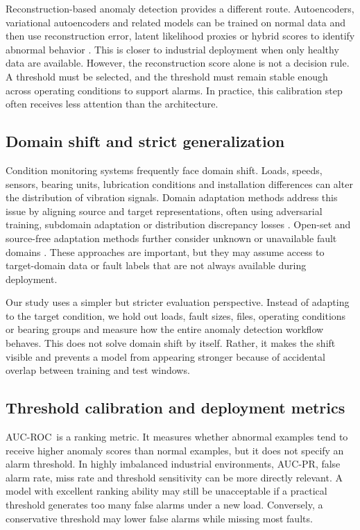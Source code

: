 \documentclass[pdflatex,sn-mathphys-num]{sn-jnl}
\newcommand{\rocauc}{AUC-ROC}
\newcommand{\prauc}{AUC-PR}
\begin{document}
Reconstruction-based anomaly detection provides a different route. Autoencoders, variational autoencoders and related models can be trained on normal data and then use reconstruction error, latent likelihood proxies or hybrid scores to identify abnormal behavior \citep{kingma2014vae,zhao2023hybrid}. This is closer to industrial deployment when only healthy data are available. However, the reconstruction score alone is not a decision rule. A threshold must be selected, and the threshold must remain stable enough across operating conditions to support alarms. In practice, this calibration step often receives less attention than the architecture.

\subsection{Domain shift and strict generalization}

Condition monitoring systems frequently face domain shift. Loads, speeds, sensors, bearing units, lubrication conditions and installation differences can alter the distribution of vibration signals. Domain adaptation methods address this issue by aligning source and target representations, often using adversarial training, subdomain adaptation or distribution discrepancy losses \citep{dada2021bearing,luo2022dsan,iseanet2024bearing}. Open-set and source-free adaptation methods further consider unknown or unavailable fault domains \citep{sourcefree2025bearing}. These approaches are important, but they may assume access to target-domain data or fault labels that are not always available during deployment.

Our study uses a simpler but stricter evaluation perspective. Instead of adapting to the target condition, we hold out loads, fault sizes, files, operating conditions or bearing groups and measure how the entire anomaly detection workflow behaves. This does not solve domain shift by itself. Rather, it makes the shift visible and prevents a model from appearing stronger because of accidental overlap between training and test windows.

\subsection{Threshold calibration and deployment metrics}

\rocauc\ is a ranking metric. It measures whether abnormal examples tend to receive higher anomaly scores than normal examples, but it does not specify an alarm threshold. In highly imbalanced industrial environments, \prauc, false alarm rate, miss rate and threshold sensitivity can be more directly relevant. A model with excellent ranking ability may still be unacceptable if a practical threshold generates too many false alarms under a new load. Conversely, a conservative threshold may lower false alarms while missing most faults.
\end{document}
